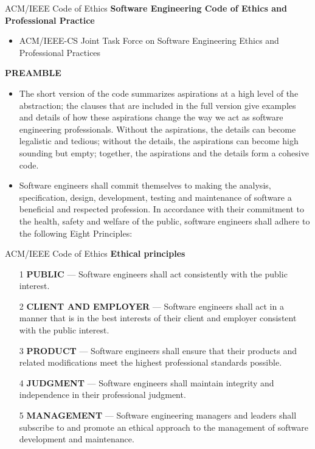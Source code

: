 \documentclass{beamer}
\begin{document}
\begin{frame}{ACM/IEEE Code of Ethics}
\textbf{Software Engineering Code of Ethics and Professional Practice}
\begin{itemize}
	\item ACM/IEEE-CS Joint Task Force on Software Engineering Ethics and Professional Practices
\end{itemize}
\textbf{PREAMBLE}
\begin{itemize}
	\item The short version of the code summarizes aspirations at a high level of the abstraction; the clauses that are included in the full version give examples and details of how these aspirations change the way we act as software engineering professionals. Without the aspirations, the details can become legalistic and tedious; without the details, the aspirations can become high sounding but empty; together, the aspirations and the details form a cohesive code.
	\item Software engineers shall commit themselves to making the analysis, specification, design, development, testing and maintenance of software a beneficial and respected profession. In accordance with their commitment to the health, safety and welfare of the public, software engineers shall adhere to the following Eight Principles:
	
\end{itemize}
\end{frame}
\begin{frame}{ACM/IEEE Code of Ethics}
	\textbf{Ethical principles}
	\begin{itemize}
		\item[1] \textbf{PUBLIC} — Software engineers shall act consistently with the public interest.
		\item[2] \textbf{ CLIENT AND EMPLOYER} — Software engineers shall act in a manner that is in the 
		best interests of their client and employer consistent with the public interest.
		\item[3] \textbf{ PRODUCT} — Software engineers shall ensure that their products and related 
		modifications meet the highest professional standards possible.
		\item[4] \textbf{ JUDGMENT} — Software engineers shall maintain integrity and independence in their 
		professional judgment.
			\item[5] \textbf{ MANAGEMENT} — Software engineering managers and leaders shall subscribe to and 
		promote an ethical approach to the management of software development and 
		maintenance.
		
	\end{itemize}
\end{frame}
\end{document}
